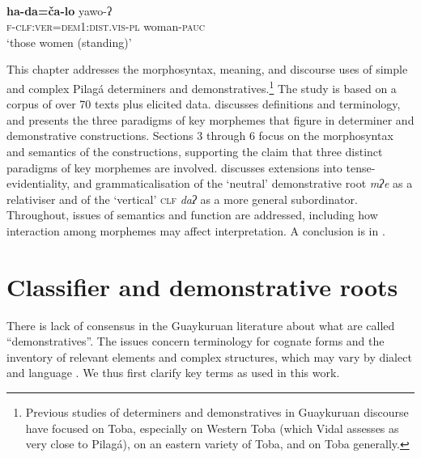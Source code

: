 \documentclass[output=paper,colorlinks,citecolor=brown]{langscibook}
\begin{document}
\ea\label{ex:payne:2} \citep[123]{Vidal2001}\\
\gll  \textbf{ha-da=ča-lo}  yawo-ʔ\\
     \textsc{f-clf:ver=dem1:dist.vis-pl} woman-\textsc{pauc}\\
\glt ‘those women (standing)’ 
\z

This chapter addresses the morphosyntax, meaning, and discourse uses of simple and complex Pilagá determiners and demonstratives.\footnote{Previous studies of determiners and demonstratives in Guaykuruan discourse have focused on Toba, especially \citet{Carpio2012} on Western Toba (which Vidal assesses as very close to Pilagá), \citet{González2015} on an eastern variety of Toba, and \citet{MessineoCúneo2019} on Toba generally.}  The study is based on a corpus of over 70 texts plus elicited data.  discusses definitions and terminology, and presents the three paradigms of key morphemes that figure in determiner and demonstrative constructions. Sections 3 through 6 focus on the morphosyntax and semantics of the constructions, supporting the claim that three distinct paradigms of key morphemes are involved.  discusses extensions into tense-evidentiality, and grammaticalisation of the ‘neutral’ demonstrative root \textit{mʔe} as a relativiser and of the ‘vertical’ \textsc{clf} \textit{daʔ} as a more general subordinator. Throughout, issues of semantics and function are addressed, including how interaction among morphemes may affect interpretation. A conclusion is in .

\section{Classifier and demonstrative roots}\label{sec:payne:2}

There is lack of consensus in the Guaykuruan literature about what are called “demonstratives”. The issues concern terminology for cognate forms and the inventory of relevant elements and complex structures, which may vary by dialect and language \citep{Vidal1997,Vidal2001,Carpio2012,González2015,MessineoEtAl2016,Cúneo2016}. We thus first clarify key terms as used in this work.
\end{document}
